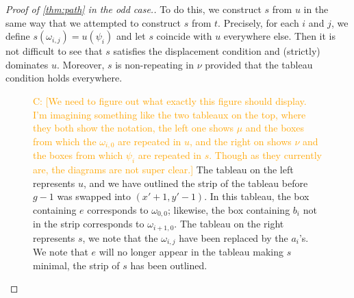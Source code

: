 \documentclass[11pt,reqno]{amsart}
\newcommand{\caelan}[1]{\textcolor{orange}{\sf C: [#1]}}
\theoremstyle{definition}
\theoremstyle{problem}
\theoremstyle{plain}
\theoremstyle{remark}
\theoremstyle{theorem}
\numberwithin{equation}{section}
\numberwithin{figure}{section}
\begin{document}
\begin{proof}[Proof of \cref{thm:path} in the odd case.]
  To do this, we construct $s$ from $u$ in the same way that we
  attempted to construct $s$ from $t$.  Precisely, for each $i$ and
  $j$, we define $s(\omega_{i,j}) = u(\psi_i)$ and let $s$ coincide
  with $u$ everywhere else.  Then it is not difficult to see that $s$
  satisfies the displacement condition and (strictly) dominates $u$.
  Moreover, $s$ is non-repeating in $\nu$ provided that the tableau
  condition holds everywhere.

  \begin{figure}[H]
    
    \caption{\caelan{We need to figure out what exactly this figure
        should display.  I'm imagining something like the two tableaux
        on the top, where they both show the notation, the left one
        shows $\mu$ and the boxes from which the $\omega_{i,0}$ are
        repeated in $u$, and the right on shows $\nu$ and the boxes
        from which $\psi_i$ are repeated in $s$.  Though as they
        currently are, the diagrams are not super clear.} The tableau
      on the left represents $u$, and we have outlined the strip of
      the tableau before $g-1$ was swapped into $(x'+1,y'-1)$. In this
      tableau, the box containing $e$ corresponds to $\omega_{0,0}$;
      likewise, the box containing $b_i$ not in the strip corresponds
      to $\omega_{i+1,0}$. The tableau on the right represents $s$, we
      note that the $\omega_{i,j}$ have been replaced by the
      $a_i$'s. We note that $e$ will no longer appear in the tableau
      making $s$ minimal, the strip of $s$ has been outlined.}
    \label{fig:pathoddproof}
  \end{figure}


\end{proof}
\end{document}
